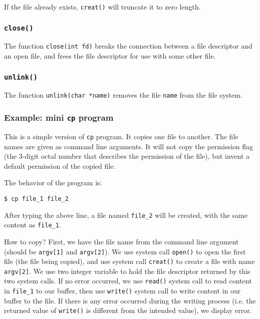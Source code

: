 \documentclass[12pt]{article}
\begin{document}
If the file already exists, \texttt{creat()} will truncate it to zero length.
\subsubsection{\texttt{close()}}
\label{sec:org2956c25}
The function \texttt{close(int fd)} breaks the connection between a file descriptor and an open file, and frees the file descriptor for use with some other file.
\subsubsection{\texttt{unlink()}}
\label{sec:org6aac87c}
The function \texttt{unlink(char *name)} removes the file \texttt{name} from the file system.

\subsubsection{Example: mini \texttt{cp} program}
\label{sec:orgc13336e}
This is a simple version of \texttt{cp} program. It copies one file to another. The file names are given as command line arguments. It will not copy the permission flag (the 3-digit octal number that describes the permission of the file), but invent a default permission of the copied file.

The behavior of the program is:
\begin{verbatim}
$ cp file_1 file_2
\end{verbatim}
After typing the above line, a file named \texttt{file\_2} will be created, with the same content as \texttt{file\_1}. 

How to copy? First, we have the file name from the command line argument (should be \texttt{argv[1]} and \texttt{argv[2]}). We use system call \texttt{open()} to open the first file (the file being copied), and use system call \texttt{creat()} to create a file with name \texttt{argv[2]}. We use two integer variable to hold the file descriptor returned by this two system calls. If no error occurred, we use \texttt{read()} system call to read content in \texttt{file\_1} to our buffer, then use \texttt{write()} system call to write content in our buffer to the file. If there is any error occurred during the writing process (i.e. the returned value of \texttt{write()} is different from the intended value), we display error.
\end{document}
